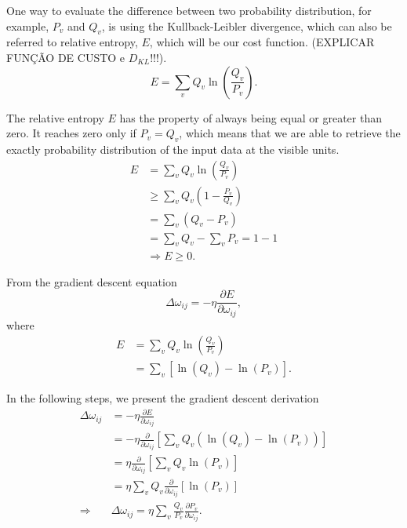 One way to evaluate the difference between two probability distribution, for example, $P_{v}$ and $Q_{v}$, is using the Kullback-Leibler divergence, which can also be referred to relative entropy, $E$, which will be our cost function.
(EXPLICAR FUN\c{C}\~{A}O DE CUSTO e $D_{KL}$!!!).
\begin{equation}
  E = \sum_{v} Q_{v} \ln{\left(\frac{Q_{v}}{P_{v}}\right)}.
  \label{eq:DKL}
\end{equation}

The relative entropy $E$ has the property of always being equal or greater than zero.
It reaches zero only if $P_{v} = Q_{v}$, which means that we are able to retrieve the exactly probability distribution of the input data at the visible units.
\begin{equation}
  \begin{split}
    E & = \sum_{v} Q_{v} \ln{\left( \frac{Q_{v}}{P_{v}} \right)} \\
      & \geq \sum_{v} Q_{v} \left( 1 - \frac{P_{v}}{Q_{v}} \right) \\
      & = \sum_{v} \left( Q_{v} - P_{v} \right) \\
      & = \sum_{v} Q_{v} - \sum_{v} P_{v} = 1 - 1 \\
      & \Rightarrow E \geq 0.
  \end{split}
\end{equation}

From the gradient descent equation
\begin{equation}
  \Delta \omega_{ij} = -\eta \frac{\partial E}{\partial \omega_{ij}},
  \label{eq:gradient}
\end{equation}
where
\begin{equation}
  \begin{split}
    E & = \sum_{v} Q_{v} \ln{\left(\frac{Q_{v}}{P_{v}}\right)} \\
      & = \sum_{v} \left[ \ln{(Q_{v})} - \ln{(P_{v})} \right].
  \end{split}
  \label{eq:entropy1}
\end{equation}

In the following steps, we present the gradient descent derivation
\begin{equation}
  \begin{split}
    \Delta \omega_{ij} & = - \eta \frac{\partial E}{\partial \omega_{ij}} \\
                  & = - \eta \frac{\partial}{\partial \omega_{ij}} \left[ \sum_{v} Q_{v} \left( \ln{(Q_{v})} - \ln{(P_{v})} \right) \right] \\
                  & = \eta \frac{\partial}{\partial \omega_{ij}} \left[ \sum_{v} Q_{v} \ln{(P_{v})} \right] \\
                  & = \eta \sum_{v} Q_{v} \frac{\partial}{\partial \omega_{ij}} \left[ \ln{(P_{v})} \right] \\
                  \Rightarrow & \Delta \omega_{ij} = \eta \sum_{v} \frac{Q_{v}}{P_{v}} \frac{\partial P_{v}}{\partial \omega_{ij}}.
  \end{split}
  \label{eq:grad1}
\end{equation}

